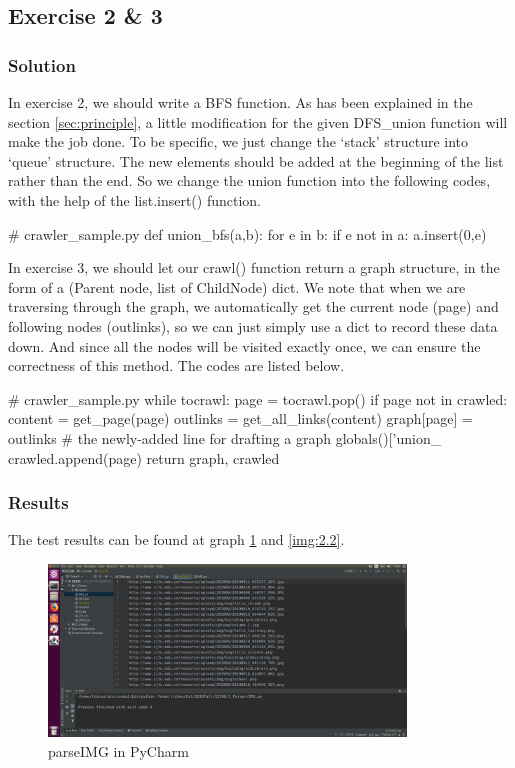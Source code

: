 \documentclass{article}
\begin{document}
\subsection{Exercise 2 \& 3}

\subsubsection{Solution}

In exercise 2, we should write a BFS function. As has been explained in the section \ref{sec:principle}, a little modification for the given DFS\_union function will make the job done. To be specific, we just change the `stack' structure into `queue' structure. The new elements should be added at the beginning of the list rather than the end. So we change the union function into the following codes, with the help of the list.insert() function. 

\begin{python}
# crawler_sample.py
def union_bfs(a,b):
    for e in b:
        if e not in a:
            a.insert(0,e)
\end{python}

In exercise 3, we should let our crawl() function return a graph structure, in the form of a (Parent node, list of ChildNode) dict. We note that when we are traversing through the graph, we automatically get the current node (page) and following nodes (outlinks), so we can just simply use a dict to record these data down. And since all the nodes will be visited exactly once, we can ensure the correctness of this method. The codes are listed below.

\begin{python}
# crawler_sample.py
while tocrawl:
    page = tocrawl.pop()
    if page not in crawled:        
    content = get_page(page)
        outlinks = get_all_links(content)
        graph[page] = outlinks  # the newly-added line for drafting a graph
        globals()['union_%
        crawled.append(page)
return graph, crawled
\end{python}


\subsubsection{Results}

The test results can be found at graph \ref{img:2.1} and \ref{img:2.2}.

\begin{figure}[htbp]
\centering
\includegraphics[width=9.5cm]{img/test2_1.png}
\caption{parseIMG in PyCharm}
\label{img:2.1}
\end{figure}
\end{document}
